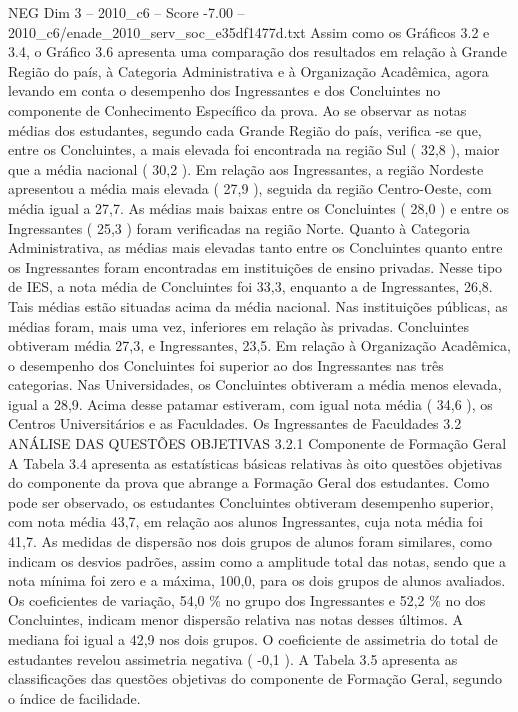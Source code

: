 \begin{textsample}{NEG Dim 3 – 2010\_c6 – Score -7.00 – 2010\_c6/enade\_2010\_serv\_soc\_e35df1477d.txt}
Assim como os Gráficos 3.2 e 3.4, o Gráfico 3.6 apresenta uma comparação dos resultados em relação à Grande Região do país, à Categoria Administrativa e à Organização Acadêmica, agora levando em conta o desempenho dos Ingressantes e dos Concluintes no componente de Conhecimento Específico da prova.
Ao se observar as notas médias dos estudantes, segundo cada Grande Região do país, verifica -se que, entre os Concluintes, a mais elevada foi encontrada na região Sul ( 32,8 ), maior que a média nacional ( 30,2 ).
Em relação aos Ingressantes, a região Nordeste apresentou a média mais elevada ( 27,9 ), seguida da região Centro-Oeste, com média igual a 27,7.
As médias mais baixas entre os Concluintes ( 28,0 ) e entre os Ingressantes ( 25,3 ) foram verificadas na região Norte.
Quanto à Categoria Administrativa, as médias mais elevadas tanto entre os Concluintes quanto entre os Ingressantes foram encontradas em instituições de ensino privadas.
Nesse tipo de IES, a nota média de Concluintes foi 33,3, enquanto a de Ingressantes, 26,8.
Tais médias estão situadas acima da média nacional.
Nas instituições públicas, as médias foram, mais uma vez, inferiores em relação às privadas.
Concluintes obtiveram média 27,3, e Ingressantes, 23,5.
Em relação à Organização Acadêmica, o desempenho dos Concluintes foi superior ao dos Ingressantes nas três categorias.
Nas Universidades, os Concluintes obtiveram a média menos elevada, igual a 28,9.
Acima desse patamar estiveram, com igual nota média ( 34,6 ), os Centros Universitários e as Faculdades.
Os Ingressantes de Faculdades 3.2 ANÁLISE DAS QUESTÕES OBJETIVAS 3.2.1 Componente de Formação Geral A Tabela 3.4 apresenta as estatísticas básicas relativas às oito questões objetivas do componente da prova que abrange a Formação Geral dos estudantes.
Como pode ser observado, os estudantes Concluintes obtiveram desempenho superior, com nota média 43,7, em relação aos alunos Ingressantes, cuja nota média foi 41,7.
As medidas de dispersão nos dois grupos de alunos foram similares, como indicam os desvios padrões, assim como a amplitude total das notas, sendo que a nota mínima foi zero e a máxima, 100,0, para os dois grupos de alunos avaliados.
Os coeficientes de variação, 54,0 \% no grupo dos Ingressantes e 52,2 \% no dos Concluintes, indicam menor dispersão relativa nas notas desses últimos.
A mediana foi igual a 42,9 nos dois grupos.
O coeficiente de assimetria do total de estudantes revelou assimetria negativa ( -0,1 ).
A Tabela 3.5 apresenta as classificações das questões objetivas do componente de Formação Geral, segundo o índice de facilidade.

\end{textsample}
